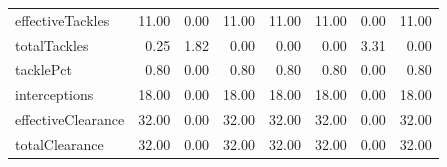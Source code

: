 \begin{table}[H]
\begin{tabular}{lrrrrrrr}
effectiveTackles & 11.00 & 0.00 & 11.00 & 11.00 & 11.00 & 0.00 & 11.00 \\
totalTackles & 0.25 & 1.82 & 0.00 & 0.00 & 0.00 & 3.31 & 0.00 \\
tacklePct & 0.80 & 0.00 & 0.80 & 0.80 & 0.80 & 0.00 & 0.80 \\
interceptions & 18.00 & 0.00 & 18.00 & 18.00 & 18.00 & 0.00 & 18.00 \\
effectiveClearance & 32.00 & 0.00 & 32.00 & 32.00 & 32.00 & 0.00 & 32.00 \\
totalClearance & 32.00 & 0.00 & 32.00 & 32.00 & 32.00 & 0.00 & 32.00 \\
\hline
\end{tabular}
\end{table}
